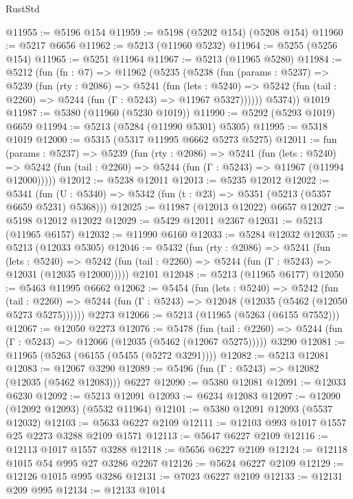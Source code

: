 \begin{lexlean}{RustStd}
\begin{coremodule}
@11955 := @5196 @154
@11959 := @5198 (@5202 @154) (@5208 @154)
@11960 := @5217 @6656
@11962 := @5213 (@11960 @5232)
@11964 := @5255 (@5256 @154)
@11965 := @5251 @11964
@11967 := @5213 (@11965 @5280)
@11984 := @5212
    (fun (fn : @7) =>
    @11962
      (@5235
        (@5238
          (fun (params : @5237) =>
          @5239
            (fun (rty : @2086) =>
            @5241
              (fun (lets : @5240) =>
              @5242 (fun (tail : @2260) => @5244 (fun (Γ : @5243) => @11967 @5327))))))
        @5374))
    @1019
@11987 := @5380 (@11960 (@5230 @1019))
@11990 := @5292 (@5293 @1019) @6659
@11994 := @5213 (@5284 (@11990 @5301) @5305)
@11995 := @5318 @1019
@12000 := @5315 (@5317 @11995 @6662 @5273 @5275)
@12011 := fun (params : @5237) =>
  @5239
    (fun (rty : @2086) =>
    @5241
      (fun (lets : @5240) =>
      @5242 (fun (tail : @2260) => @5244 (fun (Γ : @5243) => @11967 (@11994 @12000)))))
@12012 := @5238 @12011
@12013 := @5235 @12012
@12022 := @5341
    (fun (U : @5340) => @5342 (fun (t : @23) => @5351 (@5213 (@5357 @6659 @5231) @5368)))
@12025 := @11987 (@12013 @12022) @6657
@12027 := @5198 @12012 @12022
@12029 := @5429 @12011 @2367
@12031 := @5213 (@11965 @6157)
@12032 := @11990 @6160
@12033 := @5284 @12032
@12035 := @5213 (@12033 @5305)
@12046 := @5432
    (fun (rty : @2086) =>
    @5241
      (fun (lets : @5240) =>
      @5242 (fun (tail : @2260) => @5244 (fun (Γ : @5243) => @12031 (@12035 @12000)))))
    @2101
@12048 := @5213 (@11965 @6177)
@12050 := @5463 @11995 @6662
@12062 := @5454
    (fun (lets : @5240) =>
    @5242
      (fun (tail : @2260) =>
      @5244 (fun (Γ : @5243) => @12048 (@12035 (@5462 (@12050 @5273 @5275))))))
    @2273
@12066 := @5213 (@11965 (@5263 (@6155 @7552)))
@12067 := @12050 @2273
@12076 := @5478
    (fun (tail : @2260) => @5244 (fun (Γ : @5243) => @12066 (@12035 (@5462 (@12067 @5275)))))
    @3290
@12081 := @11965 (@5263 (@6155 (@5455 (@5272 @3291))))
@12082 := @5213 @12081
@12083 := @12067 @3290
@12089 := @5496 (fun (Γ : @5243) => @12082 (@12035 (@5462 @12083))) @6227
@12090 := @5380 @12081
@12091 := @12033 @6230
@12092 := @5213 @12091
@12093 := @6234 @12083
@12097 := @12090 (@12092 @12093) (@5532 @11964)
@12101 := @5380 @12091 @12093 (@5537 @12032)
@12103 := @5633 @6227 @2109
@12111 := @12103 @993 @1017 @1557 @25 @2273 @3288 @2109 @1571
@12113 := @5647 @6227 @2109
@12116 := @12113 @1017 @1557 @3288
@12118 := @5656 @6227 @2109
@12124 := @12118 @1015 @54 @995 @27 @3286 @2267
@12126 := @5624 @6227 @2109
@12129 := @12126 @1015 @995 @3286
@12131 := @7023 @6227 @2109
@12133 := @12131 @209 @995
@12134 := @12133 @1014

\end{coremodule}
\end{lexlean}
